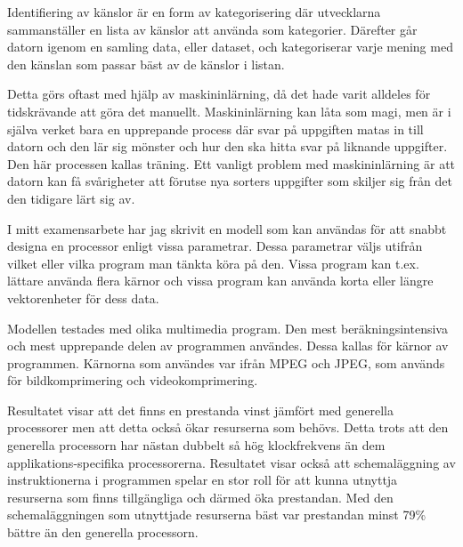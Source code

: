 \documentclass{popsci}
\begin{document}
{\noindent 

Identifiering av känslor är en form av kategorisering där utvecklarna sammanställer en lista av känslor att använda som kategorier. Därefter går datorn igenom en samling data, eller dataset, och kategoriserar varje mening med den känslan som passar bäst av de känslor i listan. 


Detta görs oftast med hjälp av maskininlärning, då det hade varit alldeles för tidskrävande att göra det manuellt. Maskininlärning kan låta som magi, men är i själva verket bara en upprepande process där svar på uppgiften matas in till datorn och den lär sig mönster och hur den ska hitta svar på liknande uppgifter. Den här processen kallas träning.  Ett vanligt problem med maskininlärning är att datorn kan få svårigheter att förutse nya sorters uppgifter som skiljer sig från det den tidigare lärt sig av. 




I mitt examensarbete har jag skrivit en modell som kan användas för att snabbt designa en processor enligt vissa parametrar. Dessa parametrar väljs utifrån vilket eller vilka program man tänkta köra på den. Vissa program kan t.ex. lättare använda flera kärnor och vissa program kan använda korta eller längre vektorenheter för dess data.

Modellen testades med olika multimedia program. Den mest beräkningsintensiva och mest upprepande delen av programmen användes. Dessa kallas för kärnor av programmen. Kärnorna som användes var ifrån MPEG och JPEG, som används för bildkomprimering och videokomprimering.


Resultatet visar att det finns en prestanda vinst jämfört med generella processorer men att detta också ökar resurserna som behövs. Detta trots att den generella processorn har nästan dubbelt så hög klockfrekvens än dem applikations-specifika processorerna. Resultatet visar också att schemaläggning av instruktionerna i programmen spelar en stor roll för att kunna utnyttja resurserna som finns tillgängliga och därmed öka prestandan. Med den schemaläggningen som utnyttjade resurserna bäst var prestandan minst 79\% bättre än den generella processorn.
}
\end{document}
